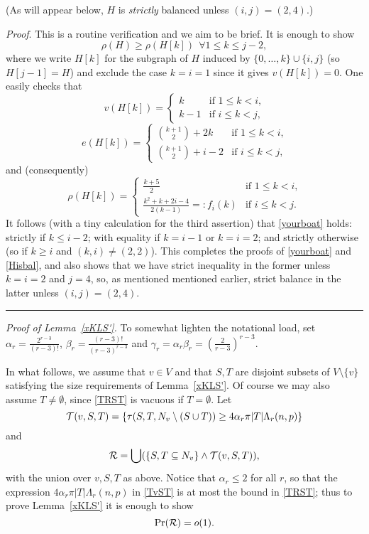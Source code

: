 \documentclass[letterpaper,11pt]{article}
\newcommand{\beq}[1]{\begin{equation}\label{#1}}
\newcommand{\enq}[0]{\end{equation}}
\newcommand{\mn}[0]{\medskip\noindent}
\newcommand{\sub}[0]{\subseteq}
\newcommand{\sm}[0]{\setminus}
\renewcommand{\dots}[0]{,\ldots,}
\newcommand{\R}[0]{{\cal R}}
\newcommand{\T}[0]{{\cal T}}
\newcommand{\0}[0]{\emptyset}
\renewcommand{\qed}[0]{\begin{flushright} \rule{2mm}{3mm} \end{flushright}}
\newcommand{\C}[2]{{{#1}\choose{{#2}}}}
\newcommand{\ga}[0]{\alpha }
\newcommand{\gb}[0]{\beta }
\newcommand{\gc}[0]{\gamma }
\newcommand{\gL}[0]{\Lambda}
\begin{document}
\mn
(As will appear below, $H$ is {\em strictly}
balanced unless $(i,j)= (2,4)$.)

\mn
{\em Proof}.  This is a routine verification
and we aim to be brief.
%
It is enough to show
\beq{yourboat}
\rho(H)\geq \rho(H[k])  ~~\forall 1\leq k \leq j-2,
\enq
where we write $H[k]$ for the subgraph
of $H$ induced by $\{0\dots k\}\cup \{i,j\}$
(so $H[j-1]=H$) and exclude the case $k=i=1$ since it gives
$v(H[k])=0$.
One easily checks that
\[
v(H[k]) = \left\{\begin{array}{cl}

k & \mbox{if $1\leq k<i$,}\\
k-1 &\mbox{if $i\leq k<j$,}
\end{array}
\right.
\]
\[
e(H[k]) = \left\{\begin{array}{cl}
\C{k+1}{2}+2k & \mbox{if $1\leq k<i$,}\\
\C{k+1}{2}+i-2 &\mbox{if $i\leq k<j$,}
\end{array}
\right.
\]
and (consequently)
\[
\rho(H[k]) = \left\{\begin{array}{ll}
\frac{k+5}{2} & \mbox{if $1\leq k<i$,}\\
\frac{k^2+k+2i-4}{2(k-1)}=:f_i(k)
 &\mbox{if $i\leq k<j$.}
\end{array}
\right.
\]
It follows (with a tiny calculation for the third assertion) that
\eqref{yourboat} holds:
strictly if $k\leq i-2$;
with equality if $k=i-1 $ or $k=i=2$; and strictly otherwise
(so if $k\geq i$ and $(k,i)\neq (2,2)$).
%
This completes the proofs of \eqref{yourboat} and \eqref{Hisbal},
and also shows that we have
strict inequality in the former unless
$k=i=2$ and $j=4$, so, as mentioned
mentioned earlier, strict balance
in the latter unless $(i,j)=(2,4)$.\qed




\mn
{\em Proof of Lemma~\ref{xKLS'}.}
To somewhat lighten the notational load, set
$\ga_r = \frac{2^{r-3}}{(r-3)!}$,
$\gb_r= \frac{(r-3)!}{(r-3)^{r-3}}$ and
$\gc_r=\ga_r\gb_r= (\frac{2}{r-3})^{r-3}$.



\medskip
In what follows, we assume that
$v\in V$ and that $S,T$ are disjoint subsets
of $V\sm \{v\}$
satisfying the size requirements of Lemma~\ref{xKLS'}.
Of course we may also assume $T\neq \0$,
since \eqref{TRST} is vacuous if $T=\0$.
%
Let
\beq{TvST}
\T(v,S,T) =
\{\tau(S,T,N_v\sm (S\cup T))\geq
4\ga_r\pi |T| \gL_r(n,p)\}\enq
and
\[\R =\bigcup(\{S,T\sub N_v\}\wedge\T(v,S,T)),\]
with the union over $v,S,T$ as above.
Notice that $\ga_r\leq 2$ for all $r$,
so that the expression
$4\ga_r\pi |T| \gL_r(n,p)$ in \eqref{TvST} is at most
the bound in \eqref{TRST};
thus to prove Lemma~\ref{xKLS'} it is enough to show
\beq{L2.2toshow}
\Pr(\R) =o(1).
\enq
\end{document}
